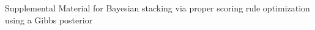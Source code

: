 \documentclass{article}
\newcommand{\1}[1]{\mathds{1}\left[#1\right]}
\begin{document}
% 

% 
% 
\Huge
\begin{center}
Supplemental Material for Bayesian stacking via proper scoring rule
optimization using a Gibbs
posterior
\end{center}

\normalsize




% 
\end{document}
